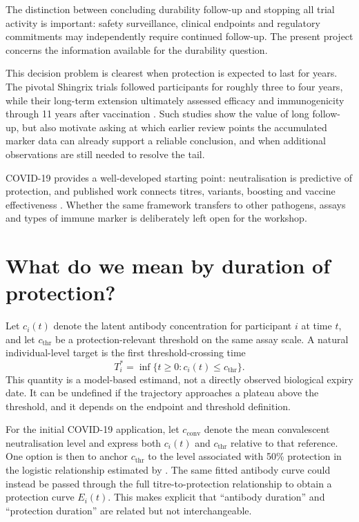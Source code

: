 \documentclass[11pt,a4paper]{article}
\begin{document}
The distinction between concluding durability follow-up and stopping all trial activity is
important: safety surveillance, clinical endpoints and regulatory commitments may independently
require continued follow-up. The present project concerns the information available for the
durability question.

This decision problem is clearest when protection is expected to last for years. The pivotal
Shingrix trials followed participants for roughly three to four years, while their long-term
extension ultimately assessed efficacy and immunogenicity through 11 years after vaccination
\parencite{strezova2025}. Such studies show the value of long follow-up, but also motivate asking at
which earlier review points the accumulated marker data can already support a reliable conclusion,
and when additional observations are still needed to resolve the tail.

COVID-19 provides a well-developed starting point: neutralisation is predictive of protection,
and published work connects titres, variants, boosting and vaccine effectiveness
\parencite{khoury2021,cromer2022,gilbert2022,feng2021}. Whether the same framework transfers to
other pathogens, assays and types of immune marker is deliberately left open for the workshop.

\section{What do we mean by duration of protection?}\label{sec:estimand}

Let $c_i(t)$ denote the latent antibody concentration for participant $i$ at time $t$, and let
$c_{\mathrm{thr}}$ be a protection-relevant threshold on the same assay scale. A natural
individual-level target is the first threshold-crossing time
\begin{equation}
  T_i^* = \inf\{t\geq 0 : c_i(t)\leq c_{\mathrm{thr}}\}.
  \label{eq:tstar}
\end{equation}
This quantity is a model-based estimand, not a directly observed biological expiry date. It can
be undefined if the trajectory approaches a plateau above the threshold, and it depends on the
endpoint and threshold definition.

For the initial COVID-19 application, let $c_{\mathrm{conv}}$ denote the mean convalescent
neutralisation level and express both $c_i(t)$ and $c_{\mathrm{thr}}$ relative to that reference.
One option is then to anchor $c_{\mathrm{thr}}$ to the level associated with 50\% protection in the
logistic relationship estimated by \textcite{khoury2021}. The same fitted antibody curve could
instead be passed through the full titre-to-protection relationship to obtain a protection curve
$E_i(t)$. This makes explicit that ``antibody duration'' and ``protection duration'' are related but
not interchangeable.
\end{document}
